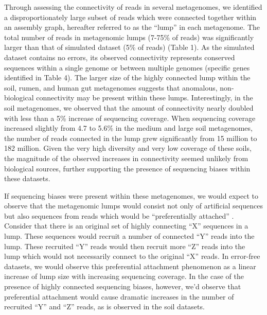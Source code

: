 \documentclass[10pt]{article}
\begin{document}
Through assessing the connectivity of reads in several metagenomes, we
identified a disproportionately large subset of reads which were
connected together within an assembly graph, hereafter referred to as
the ``lump'' in each metagenome.  The total number of reads in
metagenomic lumps (7-75\% of reads) was significantly larger than that
of simulated dataset (5\% of reads) (Table 1).  As the simulated
dataset contains no errors, its observed connectivity represents
conserved sequences within a single genome or between multiple genomes
(specific genes identified in Table 4).  The larger size of the highly
connected lump within the soil, rumen, and human gut metagenomes
suggests that anomalous, non-biological connectivity may be present
within these lumps.  Interestingly, in the soil metagenomes, we
observed that the amount of connectivity nearly doubled with less than
a 5\% increase of sequencing coverage.  When sequencing coverage
increased slightly from 4.7 to 5.6\% in the medium and large soil
metagenomes, the number of reads connected in the lump grew
significantly from 15 million to 182 million.  Given the very high
diversity and very low coverage of these soils, the magnitude of the
observed increases in connectivity seemed unlikely from biological
sources, further supporting the presence of sequencing biases within
these datasets.

If sequencing biases were present within these metagenomes, we would
expect to observe that the metagenomic lumps would consist not only of
artificial sequences but also sequences from reads which would be
``preferentially attached'' \cite{Barabasi:1999p1083}.  Consider that
there is an original set of highly connecting ``X'' sequences in a
lump.  These sequences would recruit a number of connected ``Y'' reads
into the lump.  These recruited ``Y'' reads would then recruit more
``Z'' reads into the lump which would not necessarily connect to the
original ``X'' reads.  In error-free datasets, we would observe this
preferential attachment phenomenon as a linear increase of lump size
with increasing sequencing coverage.  In the case of the presence of
highly connected sequencing biases, however, we'd observe that
preferential attachment would cause dramatic increases in the number
of recruited ``Y'' and ``Z'' reads, as is observed in the soil
datasets.
\end{document}
